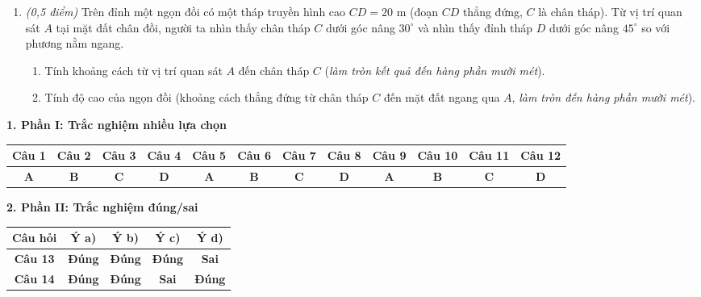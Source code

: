 \documentclass[12pt,a4paper]{article}
\newcommand{\parttitle}[1]{\par\vspace{1.5pt}{\large\bfseries\color{ink}#1}\par\vspace{1pt}}
\begin{document}
\begin{enumerate}[resume]
\item \textit{(0,5 điểm)} Trên đỉnh một ngọn đồi có một tháp truyền hình cao $CD = 20\text{ m}$ (đoạn $CD$ thẳng đứng, $C$ là chân tháp). Từ vị trí quan sát $A$ tại mặt đất chân đồi, người ta nhìn thấy chân tháp $C$ dưới góc nâng $30^\circ$ và nhìn thấy đỉnh tháp $D$ dưới góc nâng $45^\circ$ so với phương nằm ngang.
\begin{enumerate}
    \item Tính khoảng cách từ vị trí quan sát $A$ đến chân tháp $C$ (\textit{làm tròn kết quả đến hàng phần mười mét}).
    \item Tính độ cao của ngọn đồi (khoảng cách thẳng đứng từ chân tháp $C$ đến mặt đất ngang qua $A$, \textit{làm tròn đến hàng phần mười mét}).
\end{enumerate}
\end{enumerate}

\newpage
\parttitle{BẢNG ĐÁP ÁN TỔNG HỢP}

\vspace{0.15cm}
\textbf{1. Phần I: Trắc nghiệm nhiều lựa chọn}
\begin{center}
{\setlength{\tabcolsep}{2.5pt}\small
\begin{tabular}{|c|c|c|c|c|c|c|c|c|c|c|c|}
\hline
\textbf{Câu 1} & \textbf{Câu 2} & \textbf{Câu 3} & \textbf{Câu 4} & \textbf{Câu 5} & \textbf{Câu 6} & \textbf{Câu 7} & \textbf{Câu 8} & \textbf{Câu 9} & \textbf{Câu 10} & \textbf{Câu 11} & \textbf{Câu 12} \\
\hline
\textbf{A} & \textbf{B} & \textbf{C} & \textbf{D} & \textbf{A} & \textbf{B} & \textbf{C} & \textbf{D} & \textbf{A} & \textbf{B} & \textbf{C} & \textbf{D} \\
\hline
\end{tabular}}
\end{center}

\vspace{0.15cm}
\textbf{2. Phần II: Trắc nghiệm đúng/sai}
\begin{center}
\begin{tabular}{|c|c|c|c|c|}
\hline
\textbf{Câu hỏi} & \textbf{Ý a)} & \textbf{Ý b)} & \textbf{Ý c)} & \textbf{Ý d)} \\
\hline
\textbf{Câu 13} & \textbf{Đúng} & \textbf{Đúng} & \textbf{Đúng} & \textbf{Sai} \\
\hline
\textbf{Câu 14} & \textbf{Đúng} & \textbf{Đúng} & \textbf{Sai} & \textbf{Đúng} \\
\hline
\end{tabular}
\end{center}
\end{document}

